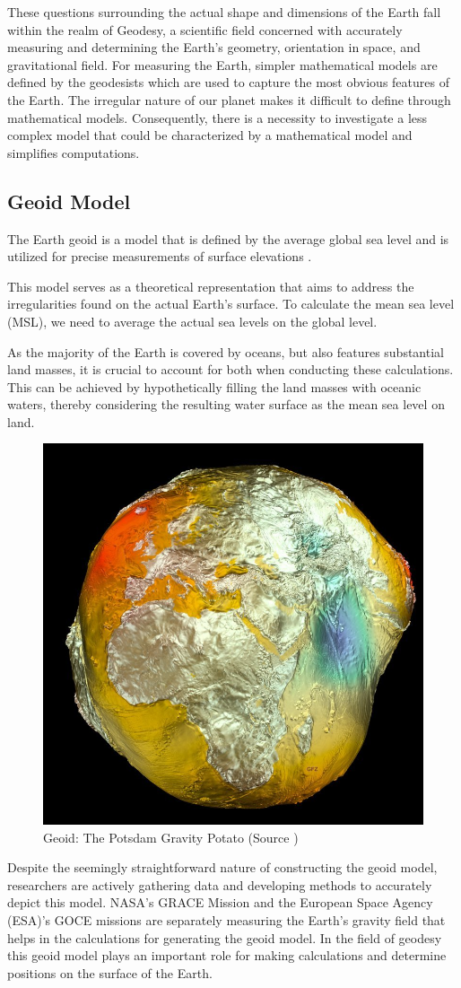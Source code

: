 These questions surrounding the actual shape and dimensions of the Earth fall within the realm of Geodesy, a scientific field concerned with accurately measuring and
determining the Earth's geometry, orientation in space, and gravitational field.
For measuring the Earth, simpler mathematical models are defined by the geodesists which are used to capture the most obvious features of the Earth\cite{GEODESY}. The irregular nature of our planet makes it difficult to define through mathematical models.
Consequently, there is a necessity to investigate a less complex model that could be characterized by a mathematical
model and simplifies computations.

\subsection{Geoid Model}
The Earth geoid is a model that is defined by the average global sea level and is utilized for precise measurements of surface elevations \cite{NOAA_GEOID}.

This model serves as a theoretical representation that aims to address the irregularities found on the actual Earth's surface. To calculate the mean sea level (MSL),
we need to average the actual sea levels on the global level.

As the majority of the Earth is covered by oceans, but also features substantial land masses, it is crucial to account for both when conducting these calculations.
This can be achieved by hypothetically filling the land masses with oceanic waters, thereby considering the resulting water surface as the mean sea level on land.
\begin{figure}[H]
    \centering
    \includegraphics[width=0.5\linewidth]{figures/chapter-2/geoid.jpg}
    \caption{Geoid: The Potsdam Gravity Potato (Source \cite{gfzpotsdamGeoidPotsdam}) }
    \label{fig:geoid-image}
\end{figure}
Despite the seemingly straightforward nature of constructing the geoid model, researchers are actively gathering data and developing methods to accurately depict this model.
NASA's GRACE Mission and the European Space Agency (ESA)'s GOCE missions are separately measuring the Earth's gravity field that helps in the calculations for generating the geoid model.
In the field of geodesy this geoid model plays an important role for making calculations and determine positions on the surface of the Earth.

